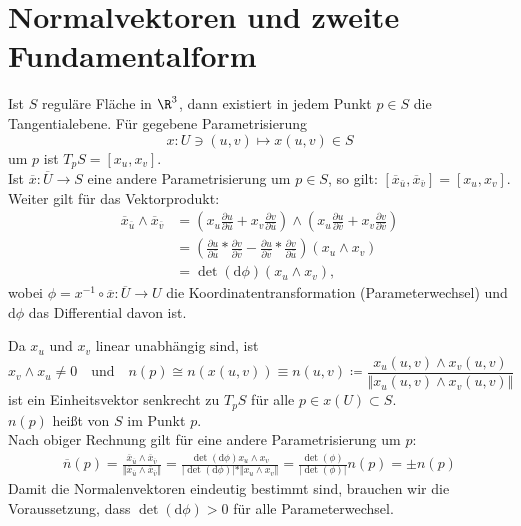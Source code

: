 \section{Normalvektoren und zweite Fundamentalform}

Ist $ S $ reguläre Fläche in $ \R^3 $, dann existiert in jedem Punkt $ p \in S $ die Tangentialebene. Für gegebene Parametrisierung 
\begin{equation*}
  x : U \ni (u,v) \mapsto x(u,v) \in S
\end{equation*}
um $ p $ ist $ T_pS = [x_u,x_v] $. \\
Ist $ \overline{x} : \overline{U} \to S $ eine andere Parametrisierung um $ p \in S $, so gilt: $ [\overline{x}_{\overline{u}},\overline{x}_{\overline{v}}] = [x_u,x_v] $. \\
Weiter gilt für das Vektorprodukt:
\begin{align*}
  \overline{x}_{\overline{u}} \wedge \overline{x}_{\overline{v}} &= \left( x_u\frac{\partial u}{\partial \overline{u}} + x_v\frac{\partial v}{\partial \overline{u}} \right) \wedge \left( x_u\frac{\partial u}{\partial \overline{v}} + x_v\frac{\partial v}{\partial \overline{v}} \right) \\
  &= \left( \frac{\partial u}{\partial \overline{u}}*\frac{\partial v}{\partial \overline{v}} - \frac{\partial u}{\partial \overline{v}}*\frac{\partial v}{\partial \overline{u}} \right) (x_u \wedge x_v) \\
  &= \det(\text{d}\phi)(x_u \wedge x_v)\text{,}
\end{align*}
wobei $ \phi = x^{-1} \circ \overline{x} : \overline{U} \to U $ die Koordinatentransformation (Parameterwechsel) und $ \text{d}\phi $ das Differential davon ist.

\begin{definition}[Normalenvektor]
  Da $ x_u $ und $ x_v $ linear unabhängig sind, ist
  \begin{equation*}
    x_v \wedge x_u \neq 0 \quad \text{und} \quad n(p) \cong n(x(u,v)) \equiv n(u,v) \coloneqq \frac{x_u(u,v) \wedge x_v(u,v)}{\Vert x_u(u,v) \wedge x_v(u,v) \Vert}
  \end{equation*}
  ist ein Einheitsvektor senkrecht zu $ T_pS $ für alle $ p \in x(U) \subset S $. \\
  $ n(p) $ heißt \label{def:normalenvektor} von $ S $ im Punkt $ p $. \\
  Nach obiger Rechnung gilt für eine andere Parametrisierung um $ p $:
  \begin{align*}
    \overline{n}(p) = \frac{\overline{x}_{\overline{u}} \wedge \overline{x}_{\overline{v}}}{\Vert \overline{x}_{\overline{u}} \wedge \overline{x}_{\overline{v}} \Vert} = \frac{\det(\text{d}\phi)x_u \wedge x_v}{\vert \det(\text{d}\phi) \vert * \Vert x_u \wedge x_v \Vert} = \frac{\det(\phi)}{\vert \det(\phi) \vert} n(p) = \pm n(p)
  \end{align*}
  Damit die Normalenvektoren eindeutig bestimmt sind, brauchen wir die Voraussetzung, dass $ \det(\text{d}\phi) > 0 $ für alle Parameterwechsel.
\end{definition}

